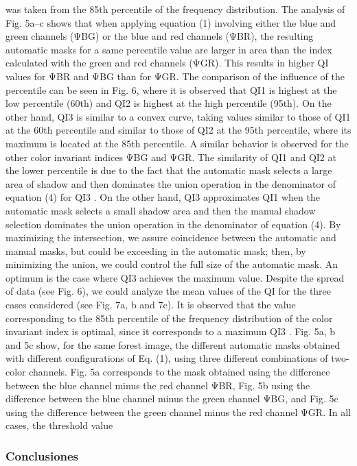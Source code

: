 was taken from the 85th percentile of the frequency distribution. The analysis of Fig. 5a–c shows that when applying equation
(1) involving either the blue and green channels (ΨBG) or the blue and red channels (ΨBR), the resulting automatic masks for a
same percentile value are larger in area than the index calculated with the green and red channels (ΨGR). This results in higher
QI values for ΨBR and ΨBG than for ΨGR.
The comparison of the influence of the percentile can be seen in Fig. 6, where it is observed that QI1
is highest at the low percentile
(60th) and QI2
is highest at the high percentile (95th). On the other hand, QI3
is similar to a convex curve, taking values similar to
those of QI1 at the 60th percentile and similar to those of QI2 at the 95th percentile, where its maximum is located at the 85th percentile. A similar behavior is observed for the other color invariant indices ΨBG and ΨGR. The similarity of QI1 and QI2 at the lower percentile is due to the fact that the automatic mask selects a large area of shadow and then dominates the union operation in the denominator of equation (4) for QI3
. On the other hand, QI3 approximates QI1 when the automatic mask selects a small shadow area and
then the manual shadow selection dominates the union operation in the denominator of equation (4). By maximizing the intersection,
we assure coincidence between the automatic and manual masks, but could be exceeding in the automatic mask; then, by minimizing
the union, we could control the full size of the automatic mask. An optimum is the case where QI3 achieves the maximum value. Despite the spread of data (see Fig. 6), we could analyze the mean values of the QI for the three cases considered (see Fig. 7a, b and 7c).
It is observed that the value corresponding to the 85th percentile of the frequency distribution of the color invariant index is optimal,
since it corresponds to a maximum QI3
.
Fig. 5a, b and 5c show, for the same forest image, the different automatic masks obtained with different configurations of Eq.
(1), using three different combinations of two-color channels. Fig. 5a corresponds to the mask obtained using the difference between the blue channel minus the red channel ΨBR, Fig. 5b using the difference between the blue channel minus the green channel ΨBG, and Fig. 5c using the difference between the green channel minus the red channel ΨGR. In all cases, the threshold value
\subsubsection{Conclusiones} \label{Conclusiones}
